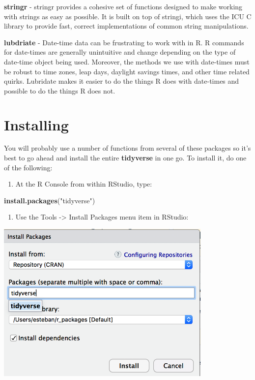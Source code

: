 \documentclass[]{book}
\newenvironment{Shaded}{\begin{snugshade}}{\end{snugshade}}
\newcommand{\KeywordTok}[1]{\textcolor[rgb]{0.13,0.29,0.53}{\textbf{#1}}}
\newcommand{\NormalTok}[1]{#1}
\newcommand{\StringTok}[1]{\textcolor[rgb]{0.31,0.60,0.02}{#1}}
\providecommand{\tightlist}{%
  \setlength{\itemsep}{0pt}\setlength{\parskip}{0pt}}
\begin{document}
\textbf{stringr} - stringr provides a cohesive set of functions designed to make working with strings as easy as possible. It is built on top of stringi, which uses the ICU C library to provide fast, correct implementations of common string manipulations.

\textbf{lubdriate} - Date-time data can be frustrating to work with in R. R commands for date-times are generally unintuitive and change depending on the type of date-time object being used. Moreover, the methods we use with date-times must be robust to time zones, leap days, daylight savings times, and other time related quirks. Lubridate makes it easier to do the things R does with date-times and possible to do the things R does not.

\hypertarget{installing}{%
\section{Installing}\label{installing}}

You will probably use a number of functions from several of these packages so it's best to go ahead and install the entire \textbf{tidyverse} in one go. To install it, do one of the following:

\begin{enumerate}
\def\labelenumi{\arabic{enumi})}
\tightlist
\item
  At the R Console from within RStudio, type:
\end{enumerate}

\begin{Shaded}
\begin{Highlighting}[]
\KeywordTok{install.packages}\NormalTok{(}\StringTok{"tidyverse"}\NormalTok{)}
\end{Highlighting}
\end{Shaded}

\begin{enumerate}
\def\labelenumi{\arabic{enumi})}
\setcounter{enumi}{1}
\tightlist
\item
  Use the Tools -\textgreater{} Install Packages menu item in RStudio:
\end{enumerate}

\includegraphics[width=4.16667in,height=\textheight]{./figures/inst.png}
\end{document}
